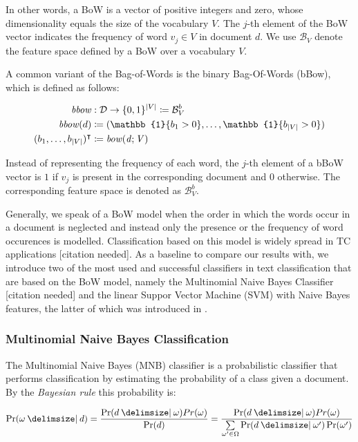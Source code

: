 In other words, a BoW is a vector of positive integers and zero, whose
dimensionality equals the size of the vocabulary $V$. The $j$-th element of the
BoW vector indicates the frequency of word $v_j \in V$ in document $d$. We use
$\mathcal{B}_V$ denote the feature space defined by a BoW over a vocabulary $V$.

A common variant of the Bag-of-Words is the binary Bag-Of-Words (bBow), which is
defined as follows:

\begin{equation*}
\begin{split}
 \mli{bbow} &: \mathcal{D} \to \{0,1\}^{|V|} \coloneqq \mathcal{B}_V^{b} \\
\mli{bbow}(d) &\coloneqq (\mathbb{1}\{b_1 > 0\},\ldots,\mathbb{1}\{b_{|V|} >
0\})\\
(b_1, \ldots, b_{|V|})^\intercal &\coloneqq \mli{bow(d; V)}
\end{split}
\end{equation*}

Instead of representing the frequency of each word, the $j$-th element of a bBoW
vector is $1$ if $v_j$ is present in the corresponding document and $0$
otherwise. The corresponding feature space is denoted as $\mathcal{B}_V^{b}$.

Generally, we speak of a BoW model when the order in which the words occur in a
document is neglected and instead only the presence or the frequency of word
occurences is modelled. Classification based on this model is widely spread in
TC applications [citation needed]. As a baseline to compare our results with, we
introduce two of the most used and successful classifiers in text classification that are based
on the BoW model, namely the Multinomial Naive Bayes Classifier [citation
needed] and the linear Suppor Vector Machine (SVM) with Naive Bayes features,
the latter of which was introduced in \cite{wang2012baselines}.

\subsubsection{Multinomial Naive Bayes Classification} The Multinomial Naive
Bayes (MNB) classifier is a probabilistic classifier that performs
classification by estimating the probability of a class given a document. 
By the \emph{Bayesian rule} this probability is:

\begin{equation}
\label{eq:nb-bayes-rule}
\Pr(\omega\given d) = \frac{\Pr(d\given\omega)Pr(\omega)}{\Pr(d)} =
\frac{\Pr(d\given\omega)Pr(\omega)}{\sum\limits_{\omega' \in \Omega} \Pr(d\given\omega') \Pr(\omega')}
\end{equation}

